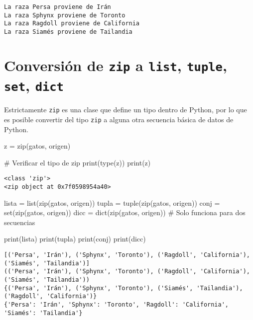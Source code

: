 \documentclass[
  letterpaper,
  DIV=11,
  numbers=noendperiod]{scrreprt}
\newenvironment{Shaded}{\begin{snugshade}}{\end{snugshade}}
\newcommand{\BuiltInTok}[1]{\textcolor[rgb]{0.00,0.23,0.31}{#1}}
\newcommand{\CommentTok}[1]{\textcolor[rgb]{0.37,0.37,0.37}{#1}}
\newcommand{\NormalTok}[1]{\textcolor[rgb]{0.00,0.23,0.31}{#1}}
\newcommand{\OperatorTok}[1]{\textcolor[rgb]{0.37,0.37,0.37}{#1}}
\begin{document}
\begin{verbatim}
La raza Persa proviene de Irán
La raza Sphynx proviene de Toronto
La raza Ragdoll proviene de California
La raza Siamés proviene de Tailandia
\end{verbatim}

\section{\texorpdfstring{Conversión de \texttt{zip} a \texttt{list},
\texttt{tuple}, \texttt{set},
\texttt{dict}}{Conversión de zip a list, tuple, set, dict}}\label{conversiuxf3n-de-zip-a-list-tuple-set-dict}

Estrictamente \texttt{zip} es una clase que define un tipo dentro de
Python, por lo que es posible convertir del tipo \texttt{zip} a alguna
otra secuencia básica de datos de Python.

\begin{Shaded}
\begin{Highlighting}[]
\NormalTok{z }\OperatorTok{=} \BuiltInTok{zip}\NormalTok{(gatos, origen)}

\CommentTok{\# Verificar el tipo de zip}
\BuiltInTok{print}\NormalTok{(}\BuiltInTok{type}\NormalTok{(z))}
\BuiltInTok{print}\NormalTok{(z)}
\end{Highlighting}
\end{Shaded}

\begin{verbatim}
<class 'zip'>
<zip object at 0x7f0598954a40>
\end{verbatim}

\begin{Shaded}
\begin{Highlighting}[]
\NormalTok{lista }\OperatorTok{=} \BuiltInTok{list}\NormalTok{(}\BuiltInTok{zip}\NormalTok{(gatos, origen))}
\NormalTok{tupla }\OperatorTok{=} \BuiltInTok{tuple}\NormalTok{(}\BuiltInTok{zip}\NormalTok{(gatos, origen))}
\NormalTok{conj }\OperatorTok{=} \BuiltInTok{set}\NormalTok{(}\BuiltInTok{zip}\NormalTok{(gatos, origen))}
\NormalTok{dicc }\OperatorTok{=} \BuiltInTok{dict}\NormalTok{(}\BuiltInTok{zip}\NormalTok{(gatos, origen)) }\CommentTok{\# Solo funciona para dos secuencias}

\BuiltInTok{print}\NormalTok{(lista)}
\BuiltInTok{print}\NormalTok{(tupla)}
\BuiltInTok{print}\NormalTok{(conj)}
\BuiltInTok{print}\NormalTok{(dicc)}
\end{Highlighting}
\end{Shaded}

\begin{verbatim}
[('Persa', 'Irán'), ('Sphynx', 'Toronto'), ('Ragdoll', 'California'), ('Siamés', 'Tailandia')]
(('Persa', 'Irán'), ('Sphynx', 'Toronto'), ('Ragdoll', 'California'), ('Siamés', 'Tailandia'))
{('Persa', 'Irán'), ('Sphynx', 'Toronto'), ('Siamés', 'Tailandia'), ('Ragdoll', 'California')}
{'Persa': 'Irán', 'Sphynx': 'Toronto', 'Ragdoll': 'California', 'Siamés': 'Tailandia'}
\end{verbatim}
\end{document}
